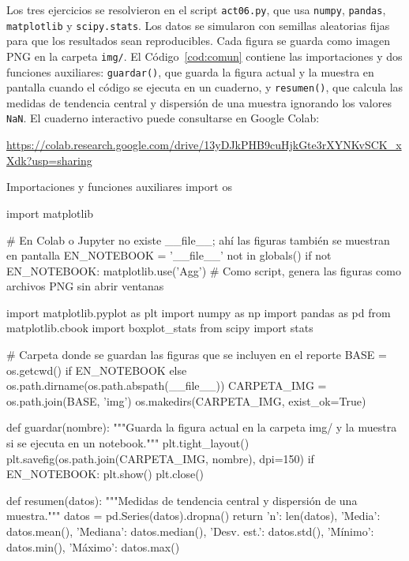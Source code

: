 \documentclass[11pt,letterpaper]{article}
\begin{document}
Los tres ejercicios se resolvieron en el script \texttt{act06.py}, que usa \texttt{numpy}, \texttt{pandas}, \texttt{matplotlib} y \texttt{scipy.stats}. Los datos se simularon con semillas aleatorias fijas para que los resultados sean reproducibles. Cada figura se guarda como imagen PNG en la carpeta \texttt{img/}. El Código~\ref{cod:comun} contiene las importaciones y dos funciones auxiliares: \texttt{guardar()}, que guarda la figura actual y la muestra en pantalla cuando el código se ejecuta en un cuaderno, y \texttt{resumen()}, que calcula las medidas de tendencia central y dispersión de una muestra ignorando los valores \texttt{NaN}. El cuaderno interactivo puede consultarse en Google Colab:

\begin{center}
    \url{https://colab.research.google.com/drive/13yDJkPHB9cuHjkGte3rXYNKvSCK_xXdk?usp=sharing}
\end{center}

\begin{codigo}[label=cod:comun]{Importaciones y funciones auxiliares}
import os

import matplotlib

# En Colab o Jupyter no existe __file__; ahí las figuras también se muestran en pantalla
EN_NOTEBOOK = '__file__' not in globals()
if not EN_NOTEBOOK:
    matplotlib.use('Agg')  # Como script, genera las figuras como archivos PNG sin abrir ventanas

import matplotlib.pyplot as plt
import numpy as np
import pandas as pd
from matplotlib.cbook import boxplot_stats
from scipy import stats

# Carpeta donde se guardan las figuras que se incluyen en el reporte
BASE = os.getcwd() if EN_NOTEBOOK else os.path.dirname(os.path.abspath(__file__))
CARPETA_IMG = os.path.join(BASE, 'img')
os.makedirs(CARPETA_IMG, exist_ok=True)


def guardar(nombre):
    """Guarda la figura actual en la carpeta img/ y la muestra si se ejecuta en un notebook."""
    plt.tight_layout()
    plt.savefig(os.path.join(CARPETA_IMG, nombre), dpi=150)
    if EN_NOTEBOOK:
        plt.show()
    plt.close()


def resumen(datos):
    """Medidas de tendencia central y dispersión de una muestra."""
    datos = pd.Series(datos).dropna()
    return {'n': len(datos), 'Media': datos.mean(), 'Mediana': datos.median(),
            'Desv. est.': datos.std(), 'Mínimo': datos.min(), 'Máximo': datos.max()}
\end{codigo}
\end{document}
